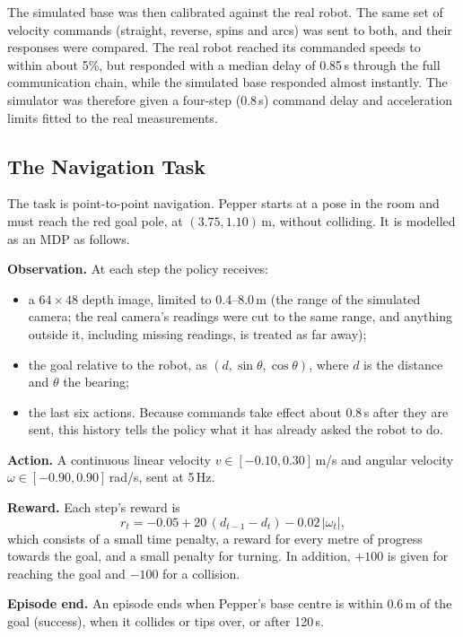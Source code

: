 The simulated base was then calibrated against the real robot. The same set of velocity commands
(straight, reverse, spins and arcs) was sent to both, and their responses were compared. The real
robot reached its commanded speeds to within about 5\%, but responded with a median delay of 0.85\,s
through the full communication chain, while the simulated base responded almost instantly. The
simulator was therefore given a four-step (0.8\,s) command delay and acceleration limits fitted
to the real measurements.

\subsection{The Navigation Task}
The task is point-to-point navigation. Pepper starts at a pose in the room and must reach the red
goal pole, at $(3.75, 1.10)$\,m, without colliding. It is modelled as an MDP as follows.

\textbf{Observation.} At each step the policy receives:
\begin{itemize}
\item a $64\times48$ depth image, limited to 0.4--8.0\,m (the range of the simulated camera; the
real camera's readings were cut to the same range, and anything outside it, including missing
readings, is treated as far away);
\item the goal relative to the robot, as $(d, \sin\theta, \cos\theta)$, where $d$ is the distance
and $\theta$ the bearing;
\item the last six actions. Because commands take effect about 0.8\,s after they are sent, this
history tells the policy what it has already asked the robot to do.
\end{itemize}

\textbf{Action.} A continuous linear velocity $v\in[-0.10, 0.30]$\,m/s and angular velocity
$\omega\in[-0.90, 0.90]$\,rad/s, sent at 5\,Hz.

\textbf{Reward.} Each step's reward is
\begin{equation}
r_t = -0.05 + 20\,(d_{t-1}-d_t) - 0.02\,|\omega_t|,
\label{eq:reward}
\end{equation}
which consists of a small time penalty, a reward for every metre of progress towards the goal,
and a small penalty for turning. In addition, $+100$ is given for reaching the goal and $-100$ for
a collision.

\textbf{Episode end.} An episode ends when Pepper's base centre is within 0.6\,m of the goal
(success), when it collides or tips over, or after 120\,s.

